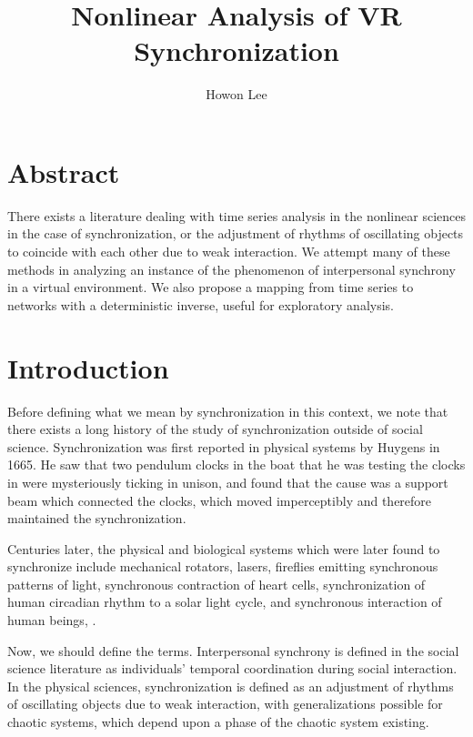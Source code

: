 \documentclass[12pt]{article}
\begin{document}
\title{Nonlinear Analysis of VR Synchronization}
\author{Howon Lee}
\maketitle

\section{Abstract}
There exists a literature dealing with time series analysis in the nonlinear sciences in the case of synchronization, or the adjustment of rhythms of oscillating objects to coincide with each other due to weak interaction. We attempt many of these methods in analyzing an instance of the phenomenon of interpersonal synchrony in a virtual environment. We also propose a mapping from time series to networks with a deterministic inverse, useful for exploratory analysis.


\section{Introduction}

Before defining what we mean by synchronization in this context, we note that there exists a long history of the study of synchronization outside of social science. Synchronization was first reported in physical systems by Huygens in 1665. He saw that two pendulum clocks in the boat that he was testing the clocks in were mysteriously ticking in unison, and found that the cause was a support beam which connected the clocks, which moved imperceptibly and therefore maintained the synchronization\cite{physsync}.

Centuries later, the physical and biological systems which were later found to synchronize include mechanical rotators, lasers, fireflies emitting synchronous patterns of light, synchronous contraction of heart cells, synchronization of human circadian rhythm to a solar light cycle, and synchronous interaction of human beings\cite{syncreview}, \cite{physsync}.

Now, we should define the terms. Interpersonal synchrony is defined in the social science literature as individuals' temporal coordination during social interaction\cite{socialsync}. In the physical sciences, synchronization is defined as an adjustment of rhythms of oscillating objects due to weak interaction, with generalizations possible for chaotic systems, which depend upon a phase of the chaotic system existing\cite{physsync}.
\end{document}
